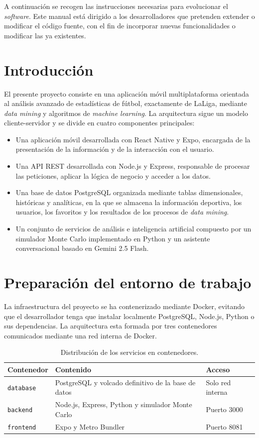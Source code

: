 
A continuación se recogen las instrucciones necesarias para evolucionar el \textit{software}. Este manual está dirigido a los desarrolladores que pretenden extender o modificar el código fuente, con el fin de incorporar nuevas funcionalidades o modificar las ya existentes.

\section{Introducción}
El presente proyecto consiste en una aplicación móvil multiplataforma orientada al análisis avanzado de estadísticas de fútbol, exactamente de LaLiga, mediante \textit{data mining} y algoritmos de \textit{machine learning}. La arquitectura sigue un modelo cliente-servidor y se divide en cuatro componentes principales:
\begin{itemize}
    \item Una aplicación móvil desarrollada con React Native y Expo, encargada de la presentación de la información y de la interacción con el usuario.
    \item Una API REST desarrollada con Node.js y Express, responsable de procesar las peticiones, aplicar la lógica de negocio y acceder a los datos.
    \item Una base de datos PostgreSQL organizada mediante tablas dimensionales, históricas y analíticas, en la que se almacena la información deportiva, los usuarios, los favoritos y los resultados de los procesos de \textit{data mining}.
    \item Un conjunto de servicios de análisis e inteligencia artificial compuesto por un simulador Monte Carlo implementado en Python y un asistente conversacional basado en Gemini 2.5 Flash.
\end{itemize}

\section{Preparaci\'on del entorno de trabajo}

La infraestructura del proyecto se ha contenerizado mediante Docker, evitando que
el desarrollador tenga que instalar localmente PostgreSQL, Node.js, Python o sus
dependencias. La arquitectura esta formada por tres contenedores comunicados
mediante una red interna de Docker.

\begin{table}[H]
\centering
\caption{Distribuci\'on de los servicios en contenedores.}
\label{tab:contenedores}
\begin{tabular}{|p{2.6cm}|p{8.2cm}|p{3cm}|}
\hline
\textbf{Contenedor} & \textbf{Contenido} & \textbf{Acceso} \\
\hline
\texttt{database} & PostgreSQL y volcado definitivo de la base de datos & Solo red interna \\
\hline
\texttt{backend} & Node.js, Express, Python y simulador Monte Carlo & Puerto 3000 \\
\hline
\texttt{frontend} & Expo y Metro Bundler & Puerto 8081 \\
\hline
\end{tabular}
\end{table}


